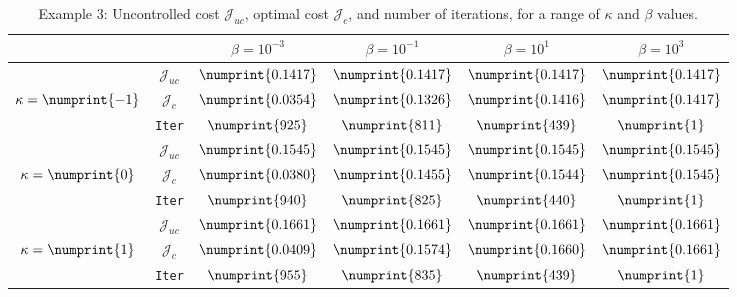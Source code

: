 \begin{table}
\begin{tabular}{ | c | c || c | c | c | c ||}
\hline
\multicolumn{2}{|c||}{}& $\beta = 10^{-3}$ & $\beta = 10^{-1}$ & $\beta = 10^{1}$ & $\beta = 10^{3}$  \\
\hline
\hline
 & $\mathcal{J}_{uc}$ & $\numprint{0.1417}$ & $\numprint{0.1417}$ & $\numprint{0.1417}$ & $\numprint{0.1417}$ \\
$\kappa= \numprint{-1}$  & $\mathcal{J}_c$ & $\numprint{0.0354}$ & $\numprint{0.1326}$ & $\numprint{0.1416}$ & $\numprint{0.1417}$ \\
& \texttt{Iter} & $\numprint{925}$ & $\numprint{811}$ & $\numprint{439}$ & $\numprint{1}$ \\
\hline
 & $\mathcal{J}_{uc}$ & $\numprint{0.1545}$ & $\numprint{0.1545}$ & $\numprint{0.1545}$ & $\numprint{0.1545}$ \\
$\kappa= \numprint{0}$  & $\mathcal{J}_c$ & $\numprint{0.0380}$ & $\numprint{0.1455}$ & $\numprint{0.1544}$ & $\numprint{0.1545}$ \\
& \texttt{Iter} & $\numprint{940}$ & $\numprint{825}$ & $\numprint{440}$ & $\numprint{1}$ \\
\hline
 & $\mathcal{J}_{uc}$ & $\numprint{0.1661}$ & $\numprint{0.1661}$ & $\numprint{0.1661}$ & $\numprint{0.1661}$ \\
$\kappa= \numprint{1}$  & $\mathcal{J}_c$ & $\numprint{0.0409}$ & $\numprint{0.1574}$ & $\numprint{0.1660}$ & $\numprint{0.1661}$ \\
& \texttt{Iter} & $\numprint{955}$ & $\numprint{835}$ & $\numprint{439}$ & $\numprint{1}$ \\
\hline
\end{tabular}
\caption{Example 3: Uncontrolled cost $\mathcal{J}_{uc}$, optimal cost $\mathcal{J}_{c}$, and number of iterations, for a range of $\kappa$ and $\beta$ values.}
\label{TabS5:Prob3}
\end{table}
